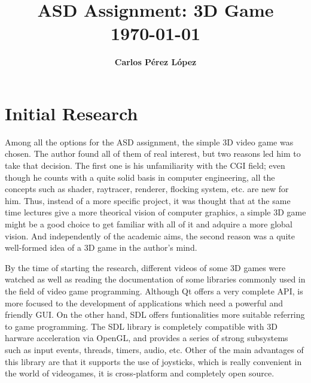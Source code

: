 \documentclass[]{article}
\title{
\vspace{2in}
\textmd{\textbf{ASD Assignment: 3D Game}}\\
\vspace{0.1in}
{\today}\\
\vspace{3in}
}
\author{\textbf{Carlos Pérez López}}
\date{}
\begin{document}
\maketitle %


\setlength\parindent{24pt} %

\renewcommand{\labelenumi}{\alph{enumi}.} %
\renewcommand{\cftsecleader}{\cftdotfill{\cftdotsep}}

\newpage
\tableofcontents
\newpage



\section{Initial Research}

Among all the options for the ASD assignment, the simple 3D video game was chosen. The author found all of them of real interest, but two reasons led him to take that decision. 
The first one is his unfamiliarity with the CGI field; even though he counts with a quite solid basis in computer engineering, all the concepts such as shader, raytracer, renderer, 
flocking system, etc. are new for him. Thus, instead of a more specific project, it was thought that at the same time lectures give a more theorical vision of computer graphics, 
a simple 3D game might be a good choice to get familiar with all of it and adquire a more global vision. And independently of the academic aims, the second reason was a quite well-formed 
idea of a 3D game in the author's mind.

By the time of starting the research, different videos of some 3D games were watched as well as reading the documentation of some libraries commonly used in the field of 
video game programming. Although Qt offers a very complete API, is more focused to the development of applications which need a powerful and friendly GUI. On the other hand, SDL offers 
funtionalities more suitable referring to game programming. The SDL library \cite{sdl} is completely compatible with 3D harware acceleration via OpenGL, and provides a series of strong subsystems
 such as input events, threads, timers, audio, etc. Other of the main advantages of this library are that it supports the use of joysticks, which is really convenient in the world of videogames,
 it is cross-platform and completely open source.
 
\end{document}
